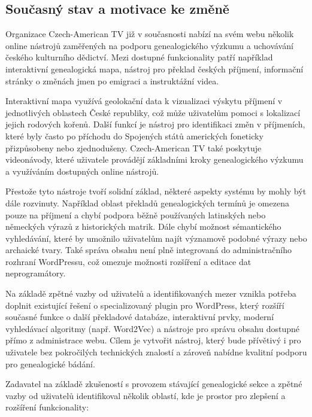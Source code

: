 \documentclass[czech, ba, kiv, he]{fasthesis}
\begin{document}
\subsection{Současný stav a motivace ke změně}

Organizace Czech-American TV již v současnosti nabízí na svém webu několik online nástrojů zaměřených na podporu genealogického výzkumu a uchovávání českého kulturního dědictví. Mezi dostupné funkcionality patří například interaktivní genealogická mapa, nástroj pro překlad českých příjmení, informační stránky o změnách jmen po emigraci a instruktážní videa.

Interaktivní mapa využívá geolokační data k vizualizaci výskytu příjmení v jednotlivých oblastech České republiky, což může uživatelům pomoci s lokalizací jejich rodových kořenů. Další funkcí je nástroj pro identifikaci změn v příjmeních, které byly často po příchodu do Spojených států amerických foneticky přizpůsobeny nebo zjednodušeny. Czech-American TV také poskytuje videonávody, které uživatele provádějí základními kroky genealogického výzkumu a využíváním dostupných online nástrojů.

Přestože tyto nástroje tvoří solidní základ, některé aspekty systému by mohly být dále rozvinuty. Například oblast překladů genealogických termínů je omezena pouze na příjmení a chybí podpora běžně používaných latinských nebo německých výrazů z historických matrik. Dále chybí možnost sémantického vyhledávání, které by umožnilo uživatelům najít významově podobné výrazy nebo archaické tvary. Také správa obsahu není plně integrovaná do administračního rozhraní WordPressu, což omezuje možnosti rozšíření a editace dat neprogramátory.

Na základě zpětné vazby od uživatelů a identifikovaných mezer vznikla potřeba doplnit existující řešení o specializovaný plugin pro WordPress, který rozšíří současné funkce o další překladové databáze, interaktivní prvky, moderní vyhledávací algoritmy (např. Word2Vec) a nástroje pro správu obsahu dostupné přímo z administrace webu. Cílem je vytvořit nástroj, který bude přívětivý i pro uživatele bez pokročilých technických znalostí a zároveň nabídne kvalitní podporu pro genealogické bádání.

Zadavatel na základě zkušeností s provozem stávající genealogické sekce a zpětné vazby od uživatelů identifikoval několik oblastí, kde je prostor pro zlepšení a rozšíření funkcionality:
\end{document}
